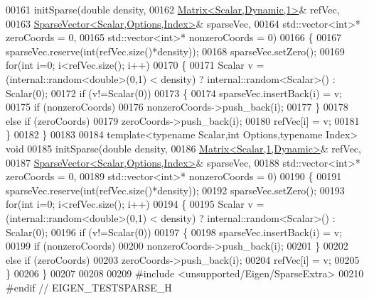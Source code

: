 \begin{DoxyCode}
00161 initSparse(\textcolor{keywordtype}{double} density,
00162            \hyperlink{group___core___module}{Matrix<Scalar,Dynamic,1>}& refVec,
00163            \hyperlink{group___sparse_core___module_class_eigen_1_1_sparse_vector}{SparseVector<Scalar,Options,Index>}& sparseVec,
00164            std::vector<int>* zeroCoords = 0,
00165            std::vector<int>* nonzeroCoords = 0)
00166 \{
00167   sparseVec.reserve(\textcolor{keywordtype}{int}(refVec.size()*density));
00168   sparseVec.setZero();
00169   \textcolor{keywordflow}{for}(\textcolor{keywordtype}{int} i=0; i<refVec.size(); i++)
00170   \{
00171     Scalar v = (internal::random<double>(0,1) < density) ? internal::random<Scalar>() : Scalar(0);
00172     \textcolor{keywordflow}{if} (v!=Scalar(0))
00173     \{
00174       sparseVec.insertBack(i) = v;
00175       \textcolor{keywordflow}{if} (nonzeroCoords)
00176         nonzeroCoords->push\_back(i);
00177     \}
00178     \textcolor{keywordflow}{else} \textcolor{keywordflow}{if} (zeroCoords)
00179         zeroCoords->push\_back(i);
00180     refVec[i] = v;
00181   \}
00182 \}
00183 
00184 \textcolor{keyword}{template}<\textcolor{keyword}{typename} Scalar,\textcolor{keywordtype}{int} Options,\textcolor{keyword}{typename} Index> \textcolor{keywordtype}{void}
00185 initSparse(\textcolor{keywordtype}{double} density,
00186            \hyperlink{group___core___module_class_eigen_1_1_matrix}{Matrix<Scalar,1,Dynamic>}& refVec,
00187            \hyperlink{group___sparse_core___module_class_eigen_1_1_sparse_vector}{SparseVector<Scalar,Options,Index>}& sparseVec,
00188            std::vector<int>* zeroCoords = 0,
00189            std::vector<int>* nonzeroCoords = 0)
00190 \{
00191   sparseVec.reserve(\textcolor{keywordtype}{int}(refVec.size()*density));
00192   sparseVec.setZero();
00193   \textcolor{keywordflow}{for}(\textcolor{keywordtype}{int} i=0; i<refVec.size(); i++)
00194   \{
00195     Scalar v = (internal::random<double>(0,1) < density) ? internal::random<Scalar>() : Scalar(0);
00196     \textcolor{keywordflow}{if} (v!=Scalar(0))
00197     \{
00198       sparseVec.insertBack(i) = v;
00199       \textcolor{keywordflow}{if} (nonzeroCoords)
00200         nonzeroCoords->push\_back(i);
00201     \}
00202     \textcolor{keywordflow}{else} \textcolor{keywordflow}{if} (zeroCoords)
00203         zeroCoords->push\_back(i);
00204     refVec[i] = v;
00205   \}
00206 \}
00207 
00208 
00209 \textcolor{preprocessor}{#include <unsupported/Eigen/SparseExtra>}
00210 \textcolor{preprocessor}{#endif // EIGEN\_TESTSPARSE\_H}
\end{DoxyCode}
